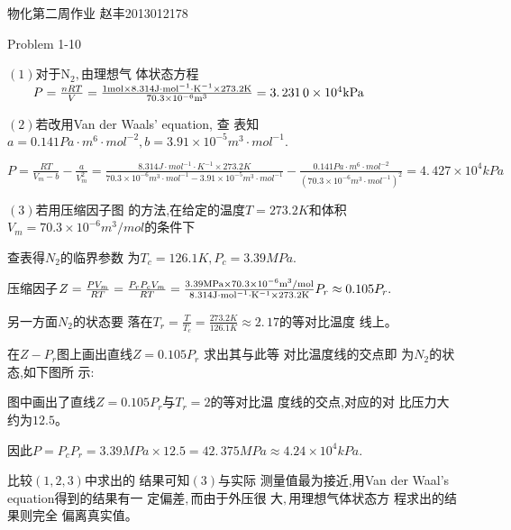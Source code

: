 \documentclass{ctexart}
\begin{document}
\bigskip 物化第二周作业\qquad
\qquad \qquad 赵丰2013012178

Problem 1-10

$\left( 1\right) $对于N$_{2},$由理想气%
体状态方程$\qquad P=\frac{nRT}{V}=\frac{1\unit{%
mol}\times 8.314\unit{J}\cdot \unit{mol}^{-1}\cdot \unit{K}^{-1}\times 273.2%
\unit{K}}{70.3\times 10^{-6}\unit{m}^{3}}=\allowbreak 3.\,\allowbreak
231\,0\times 10^{4}\unit{kPa}$

$\left( 2\right) $若改用Van der Waals' equation, 查%
表知\qquad $a=0.141\unit{Pa}\cdot \unit{m}^{6}\cdot \unit{mol}%
^{-2},b=3.91\times 10^{-5}\unit{m}^{3}\cdot \unit{mol}^{-1}.$

$P=\frac{RT}{V_{m}-b}-\frac{a}{V_{m}^{2}}=\frac{8.314\unit{J}\cdot \unit{mol}%
^{-1}\cdot \unit{K}^{-1}\times 273.2\unit{K}}{70.3\times 10^{-6}\unit{m}%
^{3}\cdot \unit{mol}^{-1}-3.91\times 10^{-5}\unit{m}^{3}\cdot \unit{mol}^{-1}%
}-\frac{0.141\unit{Pa}\cdot \unit{m}^{6}\cdot \unit{mol}^{-2}}{\left(
70.3\times 10^{-6}\unit{m}^{3}\cdot \unit{mol}^{-1}\right) ^{2}}=\allowbreak
4.\,\allowbreak 427\times 10^{4}\unit{kPa}$

$\left( 3\right) $若用压缩因子图%
的方法,在给定的温度$%
T=273.2\unit{K}$和体积$V_{m}=70.3\times 10^{-6}\unit{m}%
^{3}/\unit{mol}$的条件下

查表得$N_{2}$的临界参数%
为$T_{c}=126.1\unit{K},P_{c}=3.39\unit{MPa}.$

压缩因子$Z=\frac{PV_{m}}{RT}=\frac{P_{r}P_{c}V_{m}}{%
RT}=\frac{3.39\unit{MPa}\times 70.3\times 10^{-6}\unit{m}^{3}/\unit{mol}}{%
8.314\unit{J}\cdot \unit{mol}^{-1}\cdot \unit{K}^{-1}\times 273.2\unit{K}}%
P_{r}\approx \allowbreak 0.105P_{r}.$

另一方面$N_{2}$的状态要%
落在$T_{r}=\frac{T}{T_{c}}=\frac{273.2\unit{K}}{126.1\unit{K}}%
\approx 2.\,\allowbreak 17$的等对比温度%
线上$。 $

在$Z-P_{r}$图上画出直线$%
\allowbreak Z=0.105P_{r}$ 求出其与此等%
对比温度线的交点即%
为$N_{2}$的状态,如下图所%
示$:$



图中画出了直线$\allowbreak
Z=0.105P_{r}$与$T_{r}=2$的等对比温%
度线的交点,对应的对%
比压力大约为$12.5。 $

因此$P=P_{c}P_{r}=3.39\unit{MPa}\times 12.5=\allowbreak
42.\,\allowbreak 375\unit{MPa}\approx 4.24\times 10^{4}\unit{kPa}.$

比较$\left( 1,2,3\right) $中求出的%
结果可知$\left( 3\right) $与实际%
测量值最为接近,用Van der
Waal's equation得到的结果有一%
定偏差$,$而由于外压很%
大$,$用理想气体状态方%
程求出的结果则完全%
偏离真实值$。 $
\end{document}
